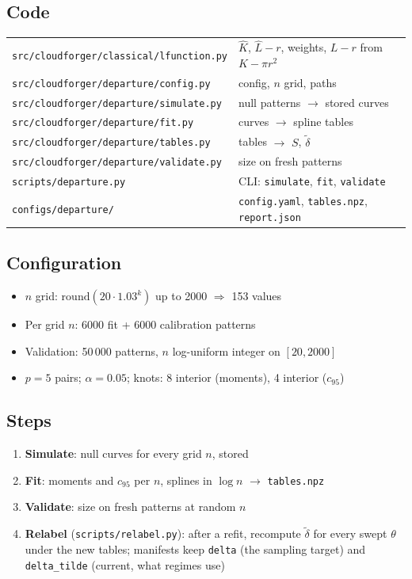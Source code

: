 \documentclass[11pt]{article}
\newcommand{\dt}{\tilde\delta}
\begin{document}
\subsection*{Code}
\begin{tabular}{@{}ll@{}}
\toprule
\texttt{src/cloudforger/classical/lfunction.py} & $\hat K$, $\hat L - r$, weights, $L-r$ from $K - \pi r^2$ \\
\texttt{src/cloudforger/departure/config.py}   & config, $n$ grid, paths \\
\texttt{src/cloudforger/departure/simulate.py} & null patterns $\to$ stored curves \\
\texttt{src/cloudforger/departure/fit.py}      & curves $\to$ spline tables \\
\texttt{src/cloudforger/departure/tables.py}   & tables $\to$ $S$, $\dt$ \\
\texttt{src/cloudforger/departure/validate.py} & size on fresh patterns \\
\texttt{scripts/departure.py}                  & CLI: \texttt{simulate}, \texttt{fit}, \texttt{validate} \\
\texttt{configs/departure/}                    & \texttt{config.yaml}, \texttt{tables.npz}, \texttt{report.json} \\
\bottomrule
\end{tabular}

\subsection*{Configuration}
\begin{itemize}
  \item $n$ grid: $\mathrm{round}(20 \cdot 1.03^k)$ up to 2000 $\Rightarrow$ 153 values
  \item Per grid $n$: 6000 fit + 6000 calibration patterns
  \item Validation: 50\,000 patterns, $n$ log-uniform integer on $[20, 2000]$
  \item $p = 5$ pairs; $\alpha = 0.05$; knots: 8 interior (moments), 4 interior ($c_{95}$)
\end{itemize}

\subsection*{Steps}
\begin{enumerate}
  \item \textbf{Simulate}: null curves for every grid $n$, stored
  \item \textbf{Fit}: moments and $c_{95}$ per $n$, splines in $\log n$ $\to$ \texttt{tables.npz}
  \item \textbf{Validate}: size on fresh patterns at random $n$
  \item \textbf{Relabel} (\texttt{scripts/relabel.py}): after a refit, recompute $\dt$ for every swept $\theta$ under the new tables; manifests keep \texttt{delta} (the sampling target) and \texttt{delta\_tilde} (current, what regimes use)
\end{enumerate}
\end{document}
